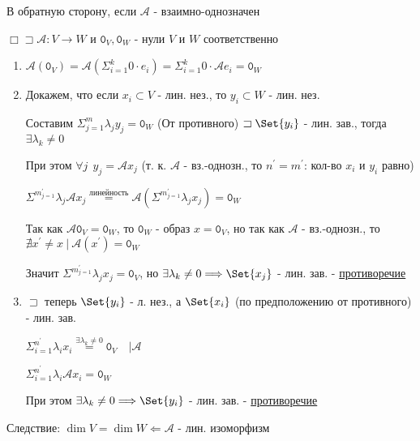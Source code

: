 \documentclass[12pt]{article}
\begin{document}
    В обратную сторону, если $\mathcal{A}$ - взаимно-однозначен

    $\Box \sqsupset \mathcal{A} : V \rightarrow W$ и $\texttt{0}_V, \texttt{0}_W$ - нули $V$ и $W$ соответственно
    \begin{enumerate}
        \item $\displaystyle \mathcal{A}(\texttt{0}_V) = \mathcal{A}(\Sigma^k_{i=1} 0 \cdot e_i) = \Sigma^k_{i=1} 0 \cdot \mathcal{A}e_i = \texttt{0}_W$

        \item Докажем, что если ${x_i} \subset V$ - лин. нез., то ${y_i} \subset W$ - лин. нез.

        Составим $\displaystyle \Sigma^m_{j=1} \lambda_j y_j = \texttt{0}_W$ (От противного) $\sqsupset \Set{y_i}$ - лин. зав., тогда $\exists \lambda_k \neq 0$

        При этом $\forall j \ \ y_j = \mathcal{A}x_j$ (т. к. $\mathcal{A}$ - вз.-однозн., то $n^\prime = m^\prime$: кол-во $x_i$ и $y_i$ равно)

        $\displaystyle \Sigma^m^\prime_{j=1} \lambda_j \mathcal{A}x_j \stackrel{\text{линейность}}{=} \mathcal{A} (\Sigma^m^\prime_{j=1} \lambda_j x_j) = \texttt{0}_W$

        Так как $\mathcal{A}\texttt{0}_V = \texttt{0}_W$, то $\texttt{0}_W$ - образ $x = \texttt{0}_V$, но так как $\mathcal{A}$ - вз.-однозн., то
        $\nexists x^\prime \neq x \ | \ \mathcal{A}(x^\prime) = \texttt{0}_W$

        Значит $\displaystyle \Sigma^m^\prime_{j=1} \lambda_j x_j = \texttt{0}_V$, но $\exists \lambda_k \neq 0 \Longrightarrow \Set{x_j}$ - лин. зав. - \underline{противоречие}

        \item $\sqsupset$ теперь $\Set{y_i}$ - л. нез., а $\Set{x_i}$ (по предположению от противного) - лин. зав.

        $\displaystyle \Sigma^{n^\prime}_{i = 1} \lambda_i x_i \stackrel{\exists \lambda_k \neq 0}{=} \texttt{0}_V \quad \Big| \mathcal{A}$

        $\displaystyle \Sigma^{n^\prime}_{i = 1} \lambda_i \mathcal{A}x_i = \texttt{0}_W$

        При этом $\exists \lambda_k \neq 0 \Longrightarrow \Set{y_i}$ - лин. зав. - \underline{противоречие}

    \end{enumerate}

    Следствие: $\dim V = \dim W \Longleftarrow \mathcal{A}$ - лин. изоморфизм
\end{document}
